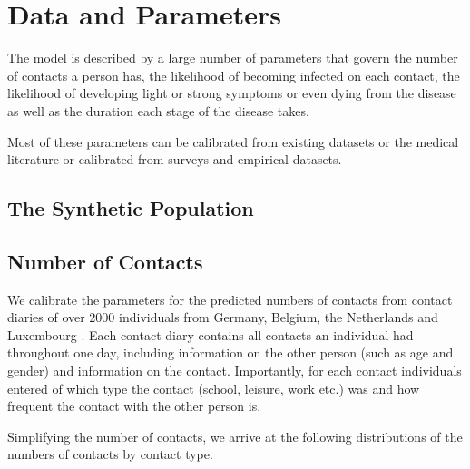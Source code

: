 \section{Data and Parameters}
\label{sec:data_and_parameters}

The model is described by a large number of parameters that govern the number of
contacts a person has, the likelihood of becoming infected on each contact, the
likelihood of developing light or strong symptoms or even dying from the disease as well
as the duration each stage of the disease takes.

Most of these parameters can be calibrated from existing datasets or the medical
literature or calibrated from surveys and empirical datasets.



\FloatBarrier

\subsection{The Synthetic Population}

\FloatBarrier


\subsection{Number of Contacts}
\label{sub:number_of_contacts}

We calibrate the parameters for the predicted numbers of contacts from contact diaries
of over 2000 individuals from Germany, Belgium, the Netherlands and Luxembourg
\citep{Mossong2008}. Each contact diary contains all contacts an individual had
throughout one day, including information on the other person (such as age and gender)
and information on the contact. Importantly, for each contact individuals entered of
which type the contact (school, leisure, work etc.) was and how frequent the contact
with the other person is.

Simplifying the number of contacts, we arrive at the following distributions of the
numbers of contacts by contact type.

